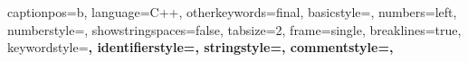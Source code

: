  {
    captionpos=b,
    language=C++,
    otherkeywords={final},
    basicstyle=\footnotesize,
    numbers=left,
    numberstyle=\small,
    showstringspaces=false,
    tabsize=2,
    frame=single,
    breaklines=true,
    keywordstyle=\bfseries\color[RGB]{127,0,85},
    identifierstyle=\color[RGB]{0,0,192},
    stringstyle=\color[RGB]{42,0,255},
    commentstyle=\color[RGB]{63,127,95},
}


\usepackage[ruled, vlined, linesnumbered]{algorithm2e}
\DontPrintSemicolon
{}

\def\chapterautorefname{Chapter}
\def\sectionautorefname{Section}
\def\subsectionautorefname{Subsection}
\def\algorithmautorefname{Algorithm}
\def\subfigureautorefname{Figure}

